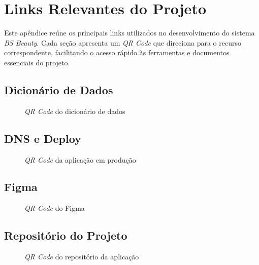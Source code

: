 \chapter{Links Relevantes do Projeto}
\label{ap:links-projeto}

Este apêndice reúne os principais links utilizados no desenvolvimento do sistema \emph{BS Beauty}. Cada seção apresenta um \emph{QR Code} que direciona para o recurso correspondente, facilitando o acesso rápido às ferramentas e documentos essenciais do projeto.

\section*{Dicionário de Dados}
\begin{figure}[h]
	\centering
		\caption{\emph{QR Code} do dicionário de dados}
		\label{fig:qrcode-dicionario-dados}
\end{figure}

\section*{DNS e Deploy}
\begin{figure}[h]
	\centering
		\caption{\emph{QR Code} da aplicação em produção}
		\label{fig:qrcode-dns-deploy}
\end{figure}

\section*{Figma}
\begin{figure}[h]
	\centering
		\caption{\emph{QR Code} do Figma}
		\label{fig:qrcode-figma}
\end{figure}

\section*{Repositório do Projeto}
\begin{figure}[h]
	\centering
		\caption{\emph{QR Code} do repositório da aplicação}
		\label{fig:qrcode-repositorio}
\end{figure}

